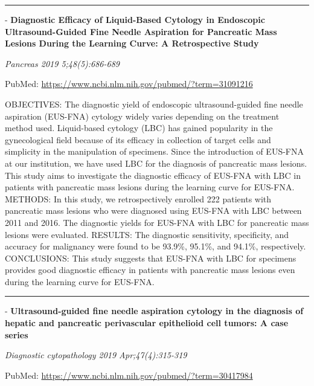 \documentclass[]{article}
\begin{document}
\begin{center}\rule{0.5\linewidth}{\linethickness}\end{center}

 - \textbf{Diagnostic Efficacy of Liquid-Based Cytology in Endoscopic
Ultrasound-Guided Fine Needle Aspiration for Pancreatic Mass Lesions
During the Learning Curve: A Retrospective Study}

\emph{Pancreas 2019 5;48(5):686-689}

PubMed: \url{https://www.ncbi.nlm.nih.gov/pubmed/?term=31091216}

OBJECTIVES: The diagnostic yield of endoscopic ultrasound-guided fine
needle aspiration (EUS-FNA) cytology widely varies depending on the
treatment method used. Liquid-based cytology (LBC) has gained popularity
in the gynecological field because of its efficacy in collection of
target cells and simplicity in the manipulation of specimens. Since the
introduction of EUS-FNA at our institution, we have used LBC for the
diagnosis of pancreatic mass lesions. This study aims to investigate the
diagnostic efficacy of EUS-FNA with LBC in patients with pancreatic mass
lesions during the learning curve for EUS-FNA. METHODS: In this study,
we retrospectively enrolled 222 patients with pancreatic mass lesions
who were diagnosed using EUS-FNA with LBC between 2011 and 2016. The
diagnostic yields for EUS-FNA with LBC for pancreatic mass lesions were
evaluated. RESULTS: The diagnostic sensitivity, specificity, and
accuracy for malignancy were found to be 93.9\%, 95.1\%, and 94.1\%,
respectively. CONCLUSIONS: This study suggests that EUS-FNA with LBC for
specimens provides good diagnostic efficacy in patients with pancreatic
mass lesions even during the learning curve for EUS-FNA.

{}

{}

\begin{center}\rule{0.5\linewidth}{\linethickness}\end{center}

 - \textbf{Ultrasound-guided fine needle aspiration cytology in the
diagnosis of hepatic and pancreatic perivascular epithelioid cell
tumors: A case series}

\emph{Diagnostic cytopathology 2019 Apr;47(4):315-319}

PubMed: \url{https://www.ncbi.nlm.nih.gov/pubmed/?term=30417984}
\end{document}
